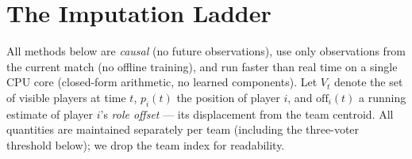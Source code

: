 \documentclass[11pt]{article}
\begin{document}
\section{The Imputation Ladder}
\label{sec:ladder}

All methods below are \emph{causal} (no future observations), use only
observations from the current match (no offline training), and run faster than
real time on a single CPU core (closed-form arithmetic, no learned components). Let $V_t$ denote the set of visible players at time $t$, $p_i(t)$ the
position of player $i$, and $\mathrm{off}_i(t)$ a running estimate of player
$i$'s \emph{role offset} --- its displacement from the team centroid. All
quantities are maintained separately per team (including the three-voter
threshold below); we drop the team index for readability.
\end{document}
